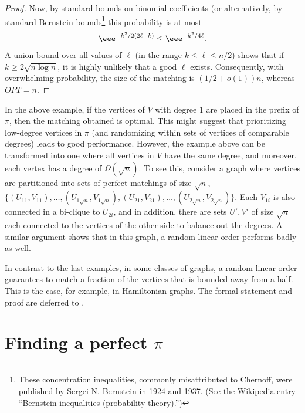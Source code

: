 \documentclass{toc}
\theoremstyle{plain}
\begin{document}
\begin{proof}
Now, by standard bounds on binomial coefficients (or alternatively, by standard
%
Bernstein bounds\footnote{These concentration inequalities, 
commonly misattributed to Chernoff, were published by 
Sergei N. Bernstein in 1924 and 1937. (See the Wikipedia
entry
\href{https://en.wikipedia.org/wiki/Bernstein_inequalities_(probability_theory)}{%
``Bernstein inequalities (probability theory).''})}
this probability is at most 
	\begin{eqnarray}
		\eee^{-k^2/2(2\ell-k)} \le \eee^{-k^2/4\ell}.
	\end{eqnarray}
	A union bound over all values of $\ell$ (in the range
%
$k \le \ell \le n/2$)   %
shows that if $k \ge 2\sqrt{n\log n}$, it is highly unlikely that a good $\ell$ exists. Consequently, with overwhelming probability, the size of the matching is $(1/2 +o(1))n$, whereas $OPT=n$.
\end{proof}



In the above example, if the vertices of $V$ with degree 1 are placed in the prefix of $\pi$, then the %
matching obtained  %
is optimal. This might suggest that prioritizing
%
low-degree   %
vertices in $\pi$ (and randomizing within sets of vertices of comparable degrees) leads to good performance.
However, the example above can be transformed into one where all vertices in $V$ have the same degree, and moreover, each vertex has a degree of $\Omega(\sqrt{n})$.
To see this, consider a graph where vertices are partitioned into sets of perfect matchings of size $\sqrt{n}$, $\{(U_{11},V_{11}),\ldots, (U_{1\sqrt{n}},V_{1\sqrt{n}}), (U_{21},V_{21}),\ldots, (U_{2\sqrt{n}},V_{2\sqrt{n}})\}$. Each $V_{1i}$ is also connected in a bi-clique to $U_{2i}$, and in addition, there are sets $U',V'$ of size $\sqrt{n}$ each connected to the vertices of the other side to balance out the degrees. A similar argument shows that in this graph, a random linear order performs badly as well. 

In contrast to the last examples, in some classes of graphs, a random linear order guarantees to match a fraction of the vertices that is bounded away from a half.
This is the case, for example, in Hamiltonian graphs.
The formal statement and proof are deferred to .


%
\section{Finding a perfect \texorpdfstring{$\pi$}{pi}}   %
%
\label{sec:perfect-pi}
\end{document}
